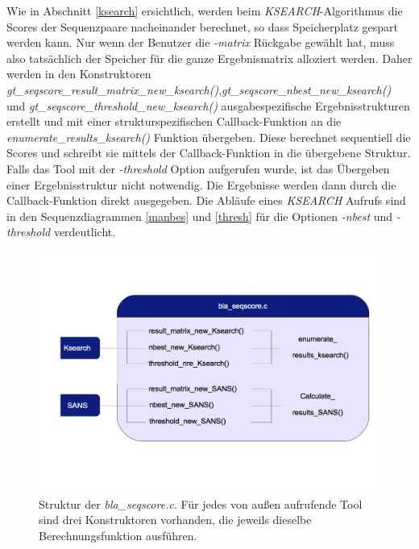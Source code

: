\documentclass{article}
\begin{document}
Wie in Abschnitt \ref{ksearch} ersichtlich, werden beim \emph{KSEARCH}-Algorithmus die Scores der Sequenzpaare nacheinander berechnet, so dass Speicherplatz gespart werden kann. Nur wenn der Benutzer die \emph{-matrix} Rückgabe gewählt hat, muss also tatsächlich der Speicher für die ganze Ergebnismatrix alloziert werden. Daher werden in den Konstruktoren \emph{gt\_seqscore\_result\_matrix\_new\_ksearch()},\linebreak \emph{gt\_seqscore\_nbest\_new\_ksearch()} und  \emph{gt\_seqscore\_threshold\_new\_ksearch()} ausgabespezifische Ergebnisstrukturen erstellt und mit einer strukturspezifischen Call\-back-Funktion an 
die \emph{enumerate\_results\_ksearch()} Funktion übergeben. Diese berechnet sequentiell die Scores und schreibt sie mittels der Callback-Funktion in die übergebene Struktur. Falls das Tool mit der \emph{-threshold} Option aufgerufen wurde, ist das Übergeben einer Ergebnisstruktur nicht notwendig. Die Ergebnisse werden dann durch die Callback-Funktion direkt ausgegeben. Die Abläufe eines \emph{KSEARCH} Aufrufs sind in den Sequenzdiagrammen \ref{manbes} und \ref{thresh} für die Optionen \emph{-nbest} und \emph{-threshold} verdeutlicht. \\

\begin{center}
  \begin{figure}
    \includegraphics[width = \linewidth]{img/dia2}
    \caption{Struktur der \emph{bla\_seqscore.c}. Für jedes von außen aufrufende Tool sind drei Konstruktoren vorhanden, die jeweils dieselbe Berechnungsfunktion ausführen.}
    \label{seqsc}
  \end{figure}
\end{center}
\end{document}
